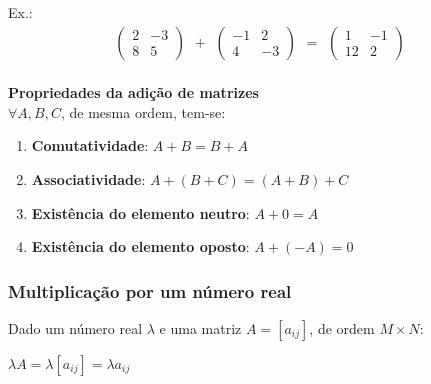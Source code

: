 \documentclass[12pt]{article}
\begin{document}
\noindent
Ex.: \[
\begin{array}{c}
    \begin{pmatrix}
         2  & -3 \\
         8  &  5
    \end{pmatrix}
\end{array}
    +
\begin{array}{c}
    \begin{pmatrix}
        -1  &  2 \\
         4  & -3
    \end{pmatrix}
\end{array}
    =
\begin{array}{c}
    \begin{pmatrix}
         1  & -1 \\
        12  &  2
    \end{pmatrix}
\end{array}
\]
\\
\noindent
\textbf{Propriedades da adição de matrizes}
\\
$\forall A,B,C$, de mesma ordem, tem-se:
\begin{enumerate}[label=\textbf{\alph*)}]
    \item \textbf{Comutatividade}: \( A + B = B + A \)
    \item \textbf{Associatividade}: \( A + (B + C) = (A + B) + C \)
    \item \textbf{Existência do elemento neutro}: \( A + 0 = A \)
    \item \textbf{Existência do elemento oposto}: \( A + (-A) = 0 \)
\end{enumerate}

\subsubsection{Multiplicação por um número real}
Dado um número real $\lambda$ e uma matriz $A=[a_{ij}]$, de ordem $M \times N$:

\noindent
$\lambda A = \lambda [a_{ij}] = \lambda a_{ij}$
\end{document}
